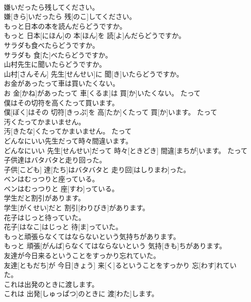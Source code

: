 \documentclass[8pt]{extreport}
\begin{document}
\begin{CJK}{UTF8}{min}
\\	嫌いだったら残してください。	
\\	嫌[きら]いだったら 残[のこ]してください。	
\\	もっと日本の本を読んだらどうですか。	
\\	もっと 日本[にほん]の 本[ほん]を 読[よ]んだらどうですか。	
\\	サラダも食べたらどうですか。	
\\	サラダも 食[た]べたらどうですか。	
\\	山村先生に聞いたらどうですか。	
\\	山村[さんそん] 先生[せんせい]に 聞[き]いたらどうですか。	
\\	お金があったって車は買いたくない。	
\\	お 金[かね]があったって 車[くるま]は 買[か]いたくない。	たって 
\\	僕はその切符を高くたって買います。	
\\	僕[ぼく]はその 切符[きっぷ]を 高[たか]くたって 買[か]います。	たって 
\\	汚くたってかまいません。	
\\	汚[きたな]くたってかまいません。	たって 
\\	どんなにいい先生だって時々間違います。	
\\	どんなにいい 先生[せんせい]だって 時々[ときどき] 間違[まちが]います。	たって 
\\	子供達はバタバタと走り回った。	
\\	子供[こども] 達[たち]はバタバタと 走り回[はしりまわ]った。	
\\	ベンはむっつりと座っている。	
\\	ベンはむっつりと 座[すわ]っている。	
\\	学生だと割引があります。	
\\	学生[がくせい]だと 割引[わりびき]があります。	
\\	花子はじっと待っていた。	
\\	花子[はなこ]はじっと 待[ま]っていた。	
\\	もっと頑張らなくてはならないという気持ちがあります。	
\\	もっと 頑張[がんば]らなくてはならないという 気持[きも]ちがあります。	
\\	友達が今日来るということをすっかり忘れていた。	
\\	友達[ともだち]が 今日[きょう] 来[く]るということをすっかり 忘[わす]れていた。	
\\	これは出発のときに渡します。	
\\	これは 出発[しゅっぱつ]のときに 渡[わた]します。	

\end{CJK}
\end{document}
